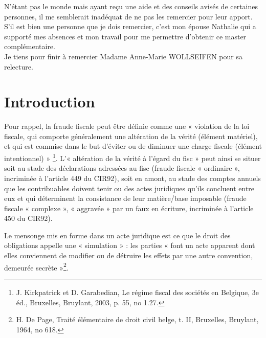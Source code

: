 \documentclass[12pt]{report}
\begin{document}
N'étant pas le monde mais ayant reçu une aide et des conseils avisés de certaines personnes, il me semblerait inadéquat de ne pas les remercier pour leur apport.\\

S'il est bien une personne que je dois remercier, c'est mon épouse Nathalie qui a supporté mes absences et mon travail pour me permettre d’obtenir ce master complémentaire. \\

Je tiens pour finir à remercier Madame Anne-Marie WOLLSEIFEN pour sa relecture.

\thispagestyle{empty}
 \newpage

\thispagestyle{empty}
\setcounter{page}{0}
\null
 \newpage




\tableofcontents

\thispagestyle{empty}
 \newpage
\setcounter{page}{0}
\null
\thispagestyle{empty}
 

\chapter{Introduction}

\pagestyle{plain}
 \setcounter{page}{1} 

Pour rappel, la fraude fiscale peut être définie comme une « violation de la loi fiscale, qui comporte généralement une altération de la vérité (élément matériel), et qui est commise dans le but d’éviter ou de diminuer une charge fiscale (élément intentionnel) » \footnote{J. Kirkpatrick et D. Garabedian, Le régime fiscal des sociétés en Belgique, 3e éd., Bruxelles, Bruylant, 2003, p. 55, no 1.27.}. L’« altération de la vérité à l’égard du fisc » peut ainsi se situer soit au stade des déclarations adressées au fisc (fraude fiscale « ordinaire », incriminée à l’article 449 du CIR92), soit en amont, au stade des comptes annuels que les contribuables doivent tenir ou des actes juridiques qu’ils concluent entre eux et qui déterminent la consistance de leur matière/base imposable (fraude fiscale « complexe », « aggravée » par un faux en écriture, incriminée à l’article 450 du CIR92).

Le mensonge mis en forme dans un acte juridique est ce que le droit des obligations appelle une « simulation » : les parties « font un acte apparent dont elles conviennent de modifier ou de détruire les effets par une autre convention, demeurée secrète »\footnote{H. De Page, Traité élémentaire de droit civil belge, t. II, Bruxelles, Bruylant, 1964, no 618.}.
\end{document}
